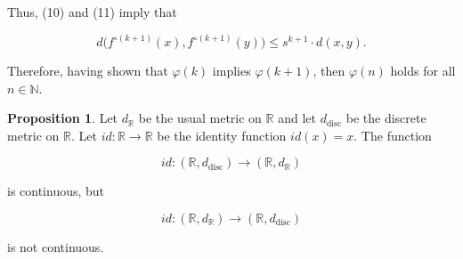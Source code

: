 \documentclass{article}
\makeatletter
\theoremstyle{definition}
\newtheorem{prop}{Proposition}[section]
\theoremstyle{remark}
\let\oldproofname=\proofname
\renewcommand{\proofname}{\bf{\textit{\oldproofname}}}
\theoremstyle{definition}
\renewenvironment{proof}[1][\proofname]{\par
  \pushQED{\qed}%
  \normalfont \topsep6\p@\@plus6\p@\relax
  \list{}{\leftmargin=0mm
          \rightmargin=0mm
          \settowidth{\itemindent}{\itshape#1}%
          \labelwidth=\itemindent
          \parsep=0pt \listparindent=0mm%
  }
  \item[\hskip\labelsep
        \itshape
    #1\@addpunct{.}]\ignorespaces
}{%
  \popQED\endlist\@endpefalse
}
\makeatother
\begin{document}
\begin{proof}
        Thus, (10) and (11) imply that 
        
        \begin{equation*}
           d\big(f^{\circ(k+1)}(x),f^{\circ(k+1)}(y)\big)\leq s^{k+1}\cdot d(x,y).
        \end{equation*}
        
        Therefore, having shown that $\varphi(k)$ implies $\varphi(k+1)$, then $\varphi(n)$ holds for all $n\in\mathbb{N}$.
    \end{proof}
    
    \newpage
    
    \begin{prop}\label{prop:1.6}
        Let $d_{\mathbb{R}}$ be the usual metric on $\mathbb{R}$ and let $d_{\text{disc}}$ be the discrete metric on $\mathbb{R}$. Let $id\colon\mathbb{R}\rightarrow\mathbb{R}$ be the identity function $id(x)=x$. The function 
    
        \begin{equation*}
            id\colon(\mathbb{R}, d_{\text{disc}})\rightarrow(\mathbb{R},d_{\mathbb{R}})
        \end{equation*}
    
        \noindent is continuous, but  
    
        \begin{equation*}
            id\colon(\mathbb{R},d_{\mathbb{R}})\rightarrow(\mathbb{R},d_{\text{disc}})
        \end{equation*}
    
        \noindent is not continuous.
    \end{prop}
    
\end{document}
